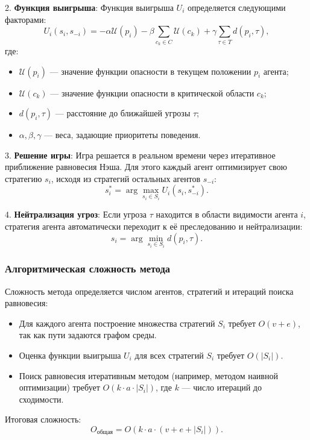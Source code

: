 2. \textbf{Функция выигрыша}:  
Функция выигрыша $U_i$ определяется следующими факторами:
\begin{equation}
	U_i(s_i, s_{-i}) = - \alpha \mathcal{U}(p_i) - \beta \sum_{c_k \in C} \mathcal{U}(c_k) + \gamma \sum_{\tau \in T} d(p_i, \tau),
\end{equation}
где:
\begin{itemize}
	\item $\mathcal{U}(p_i)$ — значение функции опасности в текущем положении $p_i$ агента;
	\item $\mathcal{U}(c_k)$ — значение функции опасности в критической области $c_k$;
	\item $d(p_i, \tau)$ — расстояние до ближайшей угрозы $\tau$;
	\item $\alpha, \beta, \gamma$ — веса, задающие приоритеты поведения.
\end{itemize}

3. \textbf{Решение игры}:  
Игра решается в реальном времени через итеративное приближение равновесия Нэша.
Для этого каждый агент оптимизирует свою стратегию $s_i$, исходя из стратегий остальных агентов $s_{-i}$:
\begin{equation}
	s_i^* = \arg\max_{s_i \in S_i} U_i(s_i, s_{-i}^*).
\end{equation}

4. \textbf{Нейтрализация угроз}:  
Если угроза $\tau$ находится в области видимости агента $i$, стратегия агента автоматически переходит к её преследованию и нейтрализации:
\begin{equation}
	s_i = \arg\min_{s_i \in S_i} d(p_i, \tau).
\end{equation}

\subsubsection*{Алгоритмическая сложность метода}
Сложность метода определяется числом агентов, стратегий и итераций поиска равновесия:
\begin{itemize}
	\item Для каждого агента построение множества стратегий $S_i$ требует $O(v + e)$, так как пути задаются графом среды.
	\item Оценка функции выигрыша $U_i$ для всех стратегий $S_i$ требует $O(|S_i|)$.
	\item Поиск равновесия итеративным методом (например, методом наивной оптимизации) требует $O(k \cdot a \cdot |S_i|)$, где $k$ — число итераций до сходимости.
\end{itemize}
Итоговая сложность:
\begin{equation}
	O_{\text{общая}} = O(k \cdot a \cdot (v + e + |S_i|)).
\end{equation}


